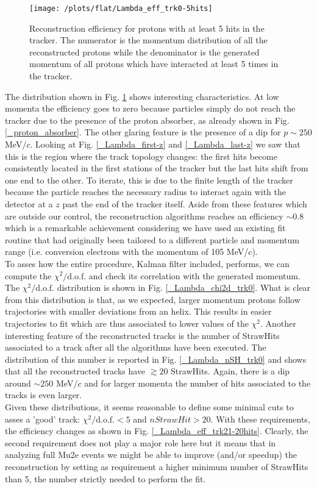 \documentclass[12pt,a4paper,openright, oneside, titlepage]{book} %
\begin{document}
\begin{figure}[!htb]
\centering
\texttt{[image: /plots/flat/Lambda\_eff\_trk0-5hits]}
\caption[Algorithm efficiency]{Reconstruction efficiency for protons with at least 5 hits in the tracker. 
The numerator is the momentum distribution of all the reconstructed protons
while the denominator is the generated momentum of all protons which have
interacted at least 5 times in the tracker.}
\label{_Lambda_eff_trk0-5hits}
\end{figure}

\noindent The distribution shown in Fig. \ref{_Lambda_eff_trk0-5hits} shows interesting characteristics. 
At low momenta the efficiency goes to zero because particles simply do not reach the tracker 
due to the presence of the proton absorber, as already shown in Fig. \ref{_proton_absorber}. 
The other glaring feature is the presence of a dip for $p\sim250$ MeV$/c$. 
Looking at Fig. \ref{_Lambda_first-z} and \ref{_Lambda_last-z} 
we saw that this is the region where the track topology changes: 
the first hits become consistently located in the first stations of the tracker 
but the last hits shift from one end to the other. 
To iterate, this is due to the finite length of the tracker because the particle reaches 
the necessary radius to interact again with the detector at a $z$ past the end of the tracker itself.
Aside from these features which are outside our control, 
the reconstruction algorithms reaches an efficiency $\sim 0.8$ 
which is a remarkable achievement considering we have used an existing fit routine 
that had originally been tailored to a different particle and momentum range
(i.e. conversion electrons with the momentum of 105 MeV/c).\\

\noindent
To asses how the entire procedure, Kalman filter included, performs, 
we can compute the $\chi^2/\textrm{d.o.f.}$ and check its correlation with the generated momentum. 
The  $\chi^2/\textrm{d.o.f.}$ distribution is shown in Fig. \ref{_Lambda_chi2d_trk0}. 
What is clear from this distribution is that, as we expected, 
larger momentum protons follow trajectories with smaller deviations from an helix. 
This results in easier trajectories to fit which are thus associated to lower values of the $\chi^2$. 
Another interesting feature of the reconstructed tracks is the number of StrawHits associated to a track after all the algorithms have been executed. 
The distribution of this number is reported in Fig. \ref{_Lambda_nSH_trk0} 
and shows that all the reconstructed tracks have $\gtrsim 20$ StrawHits. 
Again, there is a dip  around $\sim 250$ MeV$/c$ and for larger momenta the number of hits associated to the tracks is even larger.\\
Given these distributions, it seems reasonable to define some minimal cuts to asses a 'good' track: $\chi^2/\textrm{d.o.f.}<5$ and $nStrawHit>20$.
With these requirements, the efficiency changes as shown in Fig.  \ref{_Lambda_eff_trk21-20hits}.
Clearly, the second requirement does not play a major role here but it means that in analyzing full Mu2e events we might be able to improve (and/or speedup) the reconstruction by setting as requirement a higher minimum number of StrawHits than 5, the number strictly needed to perform the fit.
\end{document}
